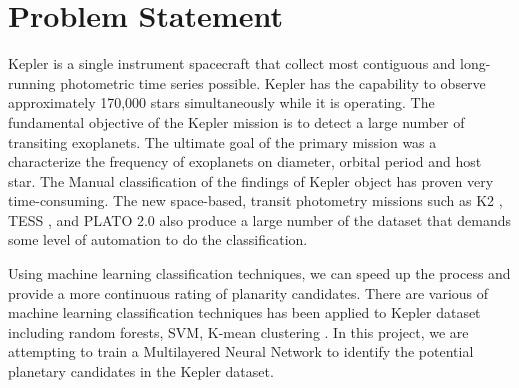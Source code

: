 \chapter{Problem Statement}

Kepler is a single instrument spacecraft that collect most contiguous and long-running photometric time series possible. Kepler has the capability to observe approximately 170,000 stars simultaneously while it is operating. The fundamental objective of the Kepler mission is to detect a large number of transiting exoplanets. The ultimate goal of the primary mission was a characterize the frequency of exoplanets on diameter, orbital period and host star.  The Manual classification of the findings of Kepler object has proven very time-consuming. The new space-based, transit photometry missions such as K2 \cite{2014PASP..126..398H}, TESS \cite{2014SPIE.9143E..20R}, and PLATO 2.0 \cite{2014ExA....38..249R} also produce a large number of the dataset that demands some level of automation to do the classification. 

Using machine learning classification techniques, we can speed up the process and provide a more continuous rating of planarity candidates. There are various of machine learning classification techniques has been applied to Kepler dataset including random forests, SVM, K-mean clustering \cite{2015ApJ...800...99T, 2015ApJ...806....6M}.  In this project, we are attempting to train a Multilayered Neural Network to identify the potential planetary candidates in the Kepler dataset. 
